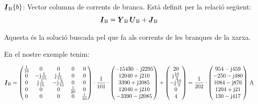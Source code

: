 \begin{list}{}
   \item[$\mcmplx{I}\ped{B}\{b\}$:]  Vector columna de corrents de branca. Est\`{a} definit per la relaci\'{o} seg\"{u}ent:
   \begin{equation}
      \mcmplx{I}\ped{B} = \mcmplx{Y}\ped{B} \,\mcmplx{U}\ped{B} + \mcmplx{J}\ped{B} \label{eq:ir}
   \end{equation}

   Aquesta \'{e}s la soluci\'{o} buscada pel que fa als corrents de les branques de la xarxa.

   En el nostre exemple tenim:
\end{list}
\[
   \mcmplx{I}\ped{B} =
   \begin{pmatrix}
         \frac{1}{10} & 0 & 0 & 0 & 0 \\
         0 & -\ju\frac{1}{15} & \ju\frac{1}{15} & 0 & 0 \\
         0 & \ju\frac{1}{15} & -\ju\frac{4}{15} & 0 & 0 \\
         0 & 0 & 0 & \frac{1}{20} & 0 \\
         0 & 0 & 0 & 0 & \frac{1}{10}
   \end{pmatrix} \cdot
   \frac{1}{101} \cdot \begin{pmatrix}
         -15430 - \ju 2295 \\
         12040 + \ju 210  \\
         3390 + \ju 2085 \\
         12040 + \ju 210  \\
         -3390 - \ju 2085
   \end{pmatrix}
   + \begin{pmatrix} 20 \\ \ju\frac{10}{3} \\ -\ju\frac{10}{3} \\ 0 \\ 4 \end{pmatrix} =
   \frac{1}{202} \cdot \begin{pmatrix}
         954 - \ju 459 \\
      -250 - \ju 480  \\
      1084 - \ju 876 \\
         1204 + \ju 21  \\
         130 - \ju 417
   \end{pmatrix}\unit{A}
\]

